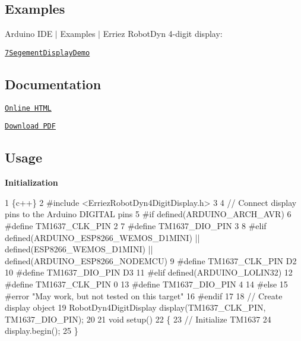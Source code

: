 \subsection*{Examples}

Arduino I\+DE $\vert$ Examples $\vert$ Erriez Robot\+Dyn 4-\/digit display\+:


\begin{DoxyItemize}
\item \href{https://github.com/Erriez/ErriezRobotDyn4DigitDisplay/blob/master/examples/7SegementDisplayDemo/7SegementDisplayDemo.ino}{\tt 7\+Segement\+Display\+Demo}
\end{DoxyItemize}

\subsection*{Documentation}


\begin{DoxyItemize}
\item \href{https://erriez.github.io/ErriezRobotDyn4DigitDisplay}{\tt Online H\+T\+ML}
\item \href{https://github.com/Erriez/ErriezRobotDyn4DigitDisplay/raw/gh-pages/latex/ErriezRobotDyn4DigitDisplay.pdf}{\tt Download P\+DF}
\end{DoxyItemize}

\subsection*{Usage}

{\bfseries Initialization}


\begin{DoxyCode}
1 \{c++\}
2 #include <ErriezRobotDyn4DigitDisplay.h>
3 
4 // Connect display pins to the Arduino DIGITAL pins
5 #if defined(ARDUINO\_ARCH\_AVR)
6 #define TM1637\_CLK\_PIN      2
7 #define TM1637\_DIO\_PIN      3
8 #elif defined(ARDUINO\_ESP8266\_WEMOS\_D1MINI) || defined(ESP8266\_WEMOS\_D1MINI) ||
       defined(ARDUINO\_ESP8266\_NODEMCU)
9 #define TM1637\_CLK\_PIN      D2
10 #define TM1637\_DIO\_PIN      D3
11 #elif defined(ARDUINO\_LOLIN32)
12 #define TM1637\_CLK\_PIN      0
13 #define TM1637\_DIO\_PIN      4
14 #else
15 #error "May work, but not tested on this target"
16 #endif
17 
18 // Create display object
19 RobotDyn4DigitDisplay display(TM1637\_CLK\_PIN, TM1637\_DIO\_PIN);
20 
21 void setup()
22 \{
23     // Initialize TM1637
24     display.begin();
25 \}
\end{DoxyCode}


